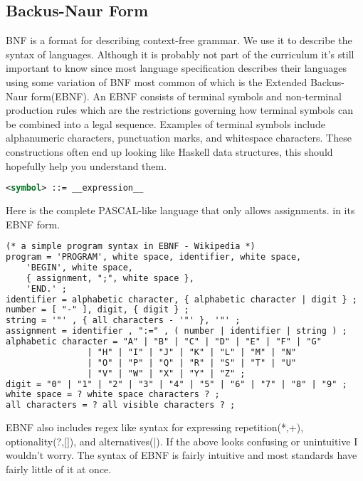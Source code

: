 \subsection{Backus-Naur Form}
    \gls{BNF} is a format for describing context-free grammar. We use it to describe the syntax of languages. Although it is probably not part of the curriculum
    it's still important to know since most language specification describes their languages using some variation of BNF most common of which is the Extended Backus-Naur form(EBNF).
    An EBNF consists of terminal symbols and non-terminal production rules which are the restrictions governing how terminal symbols can be combined into a legal sequence. 
    Examples of terminal symbols include alphanumeric characters, punctuation marks, and whitespace characters. These constructions often end up looking like Haskell data structures,
    this should hopefully help you understand them.
    \begin{lstlisting}[language=XML]
<symbol> ::= __expression__
    \end{lstlisting}
    Here is the complete PASCAL-like language that only allows assignments. in its EBNF form.
    \begin{lstlisting}[language=XML]
(* a simple program syntax in EBNF - Wikipedia *)
program = 'PROGRAM', white space, identifier, white space, 
    'BEGIN', white space, 
    { assignment, ";", white space }, 
    'END.' ;
identifier = alphabetic character, { alphabetic character | digit } ;
number = [ "-" ], digit, { digit } ;
string = '"' , { all characters - '"' }, '"' ;
assignment = identifier , ":=" , ( number | identifier | string ) ;
alphabetic character = "A" | "B" | "C" | "D" | "E" | "F" | "G"
                | "H" | "I" | "J" | "K" | "L" | "M" | "N"
                | "O" | "P" | "Q" | "R" | "S" | "T" | "U"
                | "V" | "W" | "X" | "Y" | "Z" ;
digit = "0" | "1" | "2" | "3" | "4" | "5" | "6" | "7" | "8" | "9" ;
white space = ? white space characters ? ;
all characters = ? all visible characters ? ;
    \end{lstlisting}

    EBNF also includes regex like syntax for expressing repetition(*,+), optionality(?,[]), and alternatives(|).
    If the above looks confusing or unintuitive I wouldn't worry. The syntax of EBNF is fairly intuitive and most standards have fairly little of it at once.
